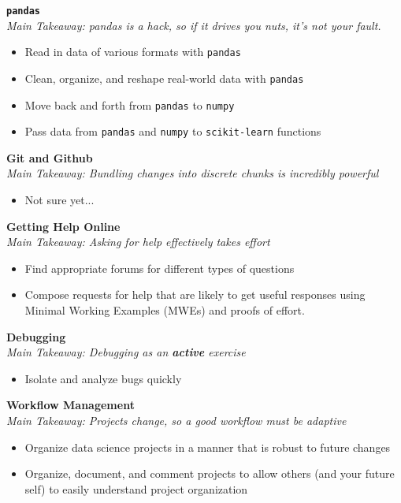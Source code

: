 \documentclass[12pt]{article}
\begin{document}
\textbf{\texttt{pandas}}\\
\emph{Main Takeaway: pandas is a hack, so if it drives you nuts, it's not your fault.}
\begin{itemize}
	\item Read in data of various formats with \texttt{pandas}
	\item Clean, organize, and reshape real-world data with \texttt{pandas}
	\item Move back and forth from \texttt{pandas} to \texttt{numpy}
	\item Pass data from \texttt{pandas} and \texttt{numpy} to \texttt{scikit-learn} functions
\end{itemize}

\textbf{Git and Github}\\
\emph{Main Takeaway: Bundling changes into discrete chunks is incredibly powerful}
\begin{itemize}
	\item Not sure yet...
\end{itemize}


\textbf{Getting Help Online}\\
\emph{Main Takeaway: Asking for help effectively takes effort}
\begin{itemize}
	\item Find appropriate forums for different types of questions
	\item Compose requests for help that are likely to get useful responses using Minimal Working Examples (MWEs) and proofs of effort.
\end{itemize}

\textbf{Debugging}\\
\emph{Main Takeaway: Debugging as an \textbf{active} exercise}
\begin{itemize}
	\item Isolate and analyze bugs quickly
\end{itemize}

\textbf{Workflow Management}\\
\emph{Main Takeaway: Projects change, so a good workflow must be adaptive}
\begin{itemize}
	\item Organize data science projects in a manner that is robust to future changes
	\item Organize, document, and comment projects to allow others (and your future self) to easily understand project organization
\end{itemize}
\end{document}
